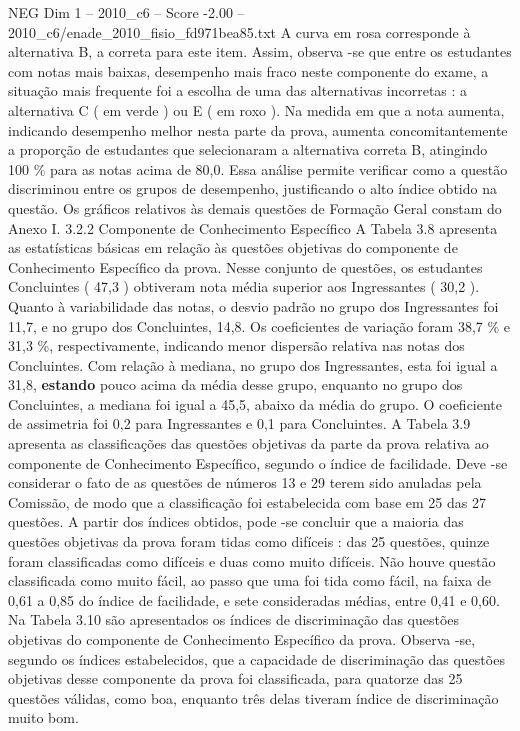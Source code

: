 \begin{textsample}{NEG Dim 1 – 2010\_c6 – Score -2.00 – 2010\_c6/enade\_2010\_fisio\_fd971bea85.txt}
A curva em rosa corresponde à alternativa B, a correta para este item.
Assim, observa -se que entre os estudantes com notas mais baixas, desempenho mais fraco neste componente do exame, a situação mais frequente foi a escolha de uma das alternativas incorretas : a alternativa C ( em verde ) ou E ( em roxo ).
Na medida em que a nota aumenta, indicando desempenho melhor nesta parte da prova, aumenta concomitantemente a proporção de estudantes que selecionaram a alternativa correta B, atingindo 100 \% para as notas acima de 80,0.
Essa análise permite verificar como a questão discriminou entre os grupos de desempenho, justificando o alto índice obtido na questão.
Os gráficos relativos às demais questões de Formação Geral constam do Anexo I. 3.2.2 Componente de Conhecimento Específico A Tabela 3.8 apresenta as estatísticas básicas em relação às questões objetivas do componente de Conhecimento Específico da prova.
Nesse conjunto de questões, os estudantes Concluintes ( 47,3 ) obtiveram nota média superior aos Ingressantes ( 30,2 ).
Quanto à variabilidade das notas, o desvio padrão no grupo dos Ingressantes foi 11,7, e no grupo dos Concluintes, 14,8.
Os coeficientes de variação foram 38,7 \% e 31,3 \%, respectivamente, indicando menor dispersão relativa nas notas dos Concluintes.
Com relação à mediana, no grupo dos Ingressantes, esta foi igual a 31,8, \textbf{estando} pouco acima da média desse grupo, enquanto no grupo dos Concluintes, a mediana foi igual a 45,5, abaixo da média do grupo.
O coeficiente de assimetria foi 0,2 para Ingressantes e 0,1 para Concluintes.
A Tabela 3.9 apresenta as classificações das questões objetivas da parte da prova relativa ao componente de Conhecimento Específico, segundo o índice de facilidade.
Deve -se considerar o fato de as questões de números 13 e 29 terem sido anuladas pela Comissão, de modo que a classificação foi estabelecida com base em 25 das 27 questões.
A partir dos índices obtidos, pode -se concluir que a maioria das questões objetivas da prova foram tidas como difíceis : das 25 questões, quinze foram classificadas como difíceis e duas como muito difíceis.
Não houve questão classificada como muito fácil, ao passo que uma foi tida como fácil, na faixa de 0,61 a 0,85 do índice de facilidade, e sete consideradas médias, entre 0,41 e 0,60.
Na Tabela 3.10 são apresentados os índices de discriminação das questões objetivas do componente de Conhecimento Específico da prova.
Observa -se, segundo os índices estabelecidos, que a capacidade de discriminação das questões objetivas desse componente da prova foi classificada, para quatorze das 25 questões válidas, como boa, enquanto três delas tiveram índice de discriminação muito bom.

\end{textsample}
